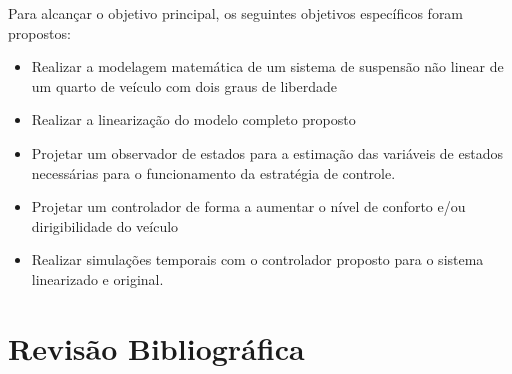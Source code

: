 \documentclass[a4paper]{ifacconf}
\begin{document}
    Para alcançar o objetivo principal, os seguintes objetivos específicos foram propostos:
    \begin{itemize}
        \item Realizar a modelagem matemática de um sistema de suspensão não linear de um quarto de veículo com dois graus de liberdade
        \item Realizar a linearização do modelo completo proposto
        \item Projetar um observador de estados para a estimação das variáveis de estados necessárias para o funcionamento da estratégia de controle.
        \item Projetar um controlador de forma a aumentar o nível de conforto e/ou dirigibilidade do veículo
        \item Realizar simulações temporais com o controlador proposto para o sistema linearizado e original.
    \end{itemize}
    \section{Revisão Bibliográfica}
\end{document}
